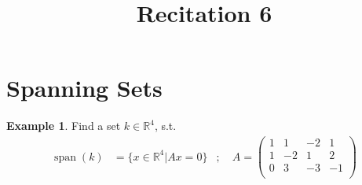 \documentclass[fleqn, a4paper, 12pt]{article}
\title{Recitation 6}
\author{}
\date{\formatdate{3}{12}{2014}}
\theoremstyle{definition}
\newtheorem{example}{Example}
\theoremstyle{theorem}
\DeclareMathOperator{\vspan}{\mathrm{span}} %
\begin{document}
\maketitle

\tableofcontents

\newpage
\section{Spanning Sets}

\begin{example}
	Find a set $k \in \mathbb{R}^4$, s.t. 
	\begin{align*}
		\vspan(k) &= \{x \in \mathbb{R}^4 | A x = 0\} & ; \quad A = 
		\begin{pmatrix}
			1 & 1 & -2 & 1\\
			1 & -2 & 1 & 2\\
			0 & 3 & -3 & -1\\
		\end{pmatrix}
	\end{align*}
\end{example}
\end{document}
